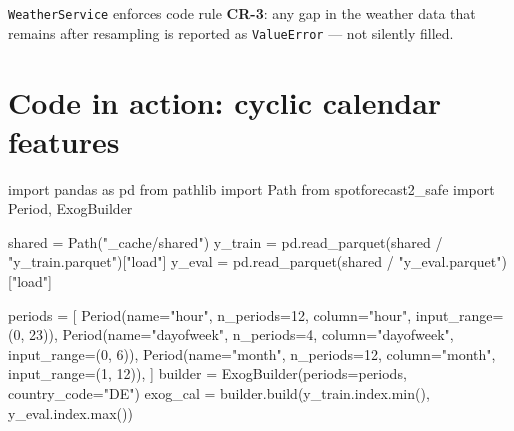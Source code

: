 \documentclass[
  english,
  letterpaper,
]{scrbook}
\newenvironment{Shaded}{\begin{snugshade}}{\end{snugshade}}
\newcommand{\BuiltInTok}[1]{\textcolor[rgb]{0.00,0.23,0.31}{#1}}
\newcommand{\DecValTok}[1]{\textcolor[rgb]{0.68,0.00,0.00}{#1}}
\newcommand{\ImportTok}[1]{\textcolor[rgb]{0.00,0.46,0.62}{#1}}
\newcommand{\NormalTok}[1]{\textcolor[rgb]{0.00,0.23,0.31}{#1}}
\newcommand{\OperatorTok}[1]{\textcolor[rgb]{0.37,0.37,0.37}{#1}}
\newcommand{\StringTok}[1]{\textcolor[rgb]{0.13,0.47,0.30}{#1}}
\begin{document}
\texttt{WeatherService} enforces code rule \textbf{CR-3}: any gap in the
weather data that remains after resampling is reported as
\texttt{ValueError} --- not silently filled.

\section{Code in action: cyclic calendar
features}\label{code-in-action-cyclic-calendar-features}

\protect{}\label{cal-features}
\begin{Shaded}
\begin{Highlighting}[]
\ImportTok{import}\NormalTok{ pandas }\ImportTok{as}\NormalTok{ pd}
\ImportTok{from}\NormalTok{ pathlib }\ImportTok{import}\NormalTok{ Path}
\ImportTok{from}\NormalTok{ spotforecast2\_safe }\ImportTok{import}\NormalTok{ Period, ExogBuilder}

\NormalTok{shared }\OperatorTok{=}\NormalTok{ Path(}\StringTok{"\_cache/shared"}\NormalTok{)}
\NormalTok{y\_train }\OperatorTok{=}\NormalTok{ pd.read\_parquet(shared }\OperatorTok{/} \StringTok{"y\_train.parquet"}\NormalTok{)[}\StringTok{"load"}\NormalTok{]}
\NormalTok{y\_eval  }\OperatorTok{=}\NormalTok{ pd.read\_parquet(shared }\OperatorTok{/} \StringTok{"y\_eval.parquet"}\NormalTok{)[}\StringTok{"load"}\NormalTok{]}

\NormalTok{periods }\OperatorTok{=}\NormalTok{ [}
\NormalTok{    Period(name}\OperatorTok{=}\StringTok{"hour"}\NormalTok{,      n\_periods}\OperatorTok{=}\DecValTok{12}\NormalTok{, column}\OperatorTok{=}\StringTok{"hour"}\NormalTok{,      input\_range}\OperatorTok{=}\NormalTok{(}\DecValTok{0}\NormalTok{, }\DecValTok{23}\NormalTok{)),}
\NormalTok{    Period(name}\OperatorTok{=}\StringTok{"dayofweek"}\NormalTok{, n\_periods}\OperatorTok{=}\DecValTok{4}\NormalTok{,  column}\OperatorTok{=}\StringTok{"dayofweek"}\NormalTok{, input\_range}\OperatorTok{=}\NormalTok{(}\DecValTok{0}\NormalTok{,  }\DecValTok{6}\NormalTok{)),}
\NormalTok{    Period(name}\OperatorTok{=}\StringTok{"month"}\NormalTok{,     n\_periods}\OperatorTok{=}\DecValTok{12}\NormalTok{, column}\OperatorTok{=}\StringTok{"month"}\NormalTok{,     input\_range}\OperatorTok{=}\NormalTok{(}\DecValTok{1}\NormalTok{, }\DecValTok{12}\NormalTok{)),}
\NormalTok{]}
\NormalTok{builder }\OperatorTok{=}\NormalTok{ ExogBuilder(periods}\OperatorTok{=}\NormalTok{periods, country\_code}\OperatorTok{=}\StringTok{"DE"}\NormalTok{)}
\NormalTok{exog\_cal }\OperatorTok{=}\NormalTok{ builder.build(y\_train.index.}\BuiltInTok{min}\NormalTok{(), y\_eval.index.}\BuiltInTok{max}\NormalTok{())}


\end{Highlighting}
\end{Shaded}
\end{document}
